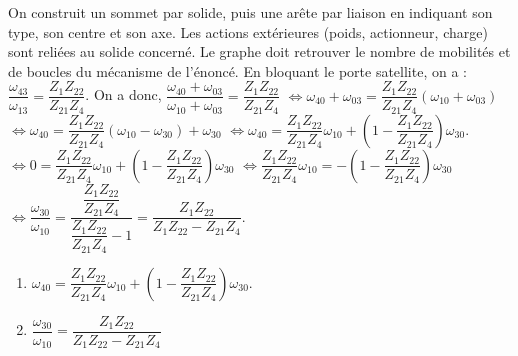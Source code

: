 \begin{corrigebox}
On construit un sommet par solide, puis une arête par liaison en
        indiquant son type, son centre et son axe. Les actions extérieures (poids,
        actionneur, charge) sont reliées au solide concerné. Le graphe doit retrouver le
        nombre de mobilités et de boucles du mécanisme de l'énoncé.
En bloquant le porte satellite, on a : $\dfrac{\omega_{43}}{\omega_{13}}=\dfrac{Z_{1}Z_{22}}{Z_{21}Z_{4}}$.
  On a donc, 
  $\dfrac{\omega_{40}+\omega_{03}}{\omega_{10}+\omega_{03}}=
\dfrac{Z_{1}Z_{22}}{Z_{21}Z_{4}}$
  $\Leftrightarrow \omega_{40}+\omega_{03}=\dfrac{Z_{1}Z_{22}}{Z_{21}Z_{4}}\left( \omega_{10}+\omega_{03} \right)$
  $\Leftrightarrow \omega_{40}=\dfrac{Z_{1}Z_{22}}{Z_{21}Z_{4}}\left( \omega_{10}-\omega_{30} \right) + \omega_{30}$
 $\Leftrightarrow \omega_{40}=\dfrac{Z_{1}Z_{22}}{Z_{21}Z_{4}}\omega_{10} +\left(1- \dfrac{Z_{1}Z_{22}}{Z_{21}Z_{4}}\right)\omega_{30}$.
$\Leftrightarrow 0=\dfrac{Z_{1}Z_{22}}{Z_{21}Z_{4}}\omega_{10} +\left(1- \dfrac{Z_{1}Z_{22}}{Z_{21}Z_{4}}\right)\omega_{30}$
$\Leftrightarrow  \dfrac{Z_{1}Z_{22}}{Z_{21}Z_{4}}\omega_{10} =-\left(1- \dfrac{Z_{1}Z_{22}}{Z_{21}Z_{4}}\right)\omega_{30}$
$\Leftrightarrow  \dfrac{\omega_{30}}{\omega_{10}} = \dfrac{ \dfrac{Z_{1}Z_{22}}{Z_{21}Z_{4}}}{ \dfrac{Z_{1}Z_{22}}{Z_{21}Z_{4}}-1}= \dfrac{ {Z_{1}Z_{22}}}{ {Z_{1}Z_{22}}-Z_{21}Z_{4}}$.

\begin{enumerate}
\item $\omega_{40}=\dfrac{Z_{1}Z_{22}}{Z_{21}Z_{4}}\omega_{10} +\left(1- \dfrac{Z_{1}Z_{22}}{Z_{21}Z_{4}}\right)\omega_{30}$.
\item $\dfrac{\omega_{30}}{\omega_{10}} = \dfrac{ {Z_{1}Z_{22}}}{ {Z_{1}Z_{22}}-Z_{21}Z_{4}}$
\end{enumerate}
\end{corrigebox}
